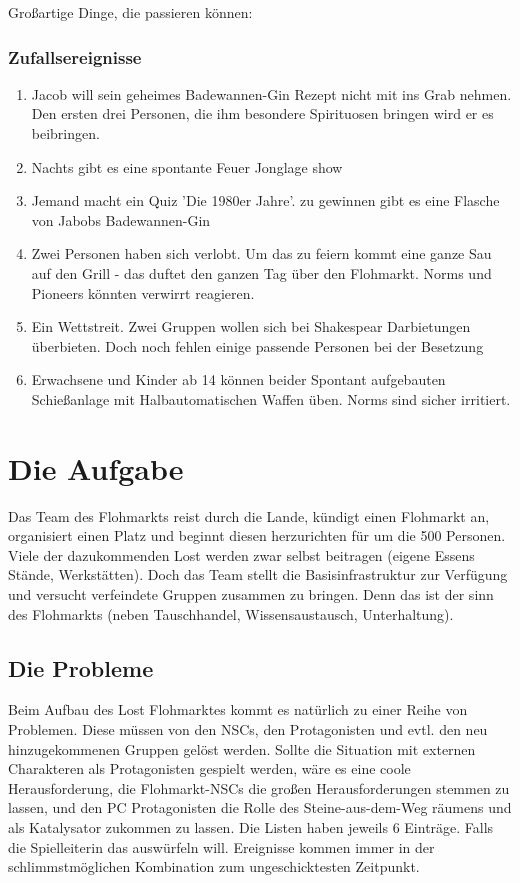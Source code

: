 Großartige Dinge, die passieren können:

\subsection{Zufallsereignisse}

\begin{enumerate}
    \item Jacob will sein geheimes Badewannen-Gin Rezept nicht mit ins Grab nehmen. Den ersten drei Personen, die ihm besondere Spirituosen bringen wird er es beibringen.
    \item Nachts gibt es eine spontante Feuer Jonglage show
    \item Jemand macht ein Quiz 'Die 1980er Jahre'. zu gewinnen gibt es eine Flasche von Jabobs Badewannen-Gin
    \item Zwei Personen haben sich verlobt. Um das zu feiern kommt eine ganze Sau auf den Grill - das duftet den ganzen Tag über den Flohmarkt. Norms und Pioneers könnten verwirrt reagieren.
    \item Ein Wettstreit. Zwei Gruppen wollen sich bei Shakespear Darbietungen überbieten. Doch noch fehlen einige passende Personen bei der Besetzung
    \item Erwachsene und Kinder ab 14 können beider Spontant aufgebauten Schießanlage mit Halbautomatischen Waffen üben. Norms sind sicher irritiert.
\end{enumerate}


\chapter{Die Aufgabe}

Das Team des Flohmarkts reist durch die Lande, kündigt einen Flohmarkt an, organisiert einen Platz und beginnt diesen herzurichten für um die 500 Personen. Viele der dazukommenden Lost werden zwar selbst beitragen (eigene Essens Stände, Werkstätten).
Doch das Team stellt die Basisinfrastruktur zur Verfügung und versucht verfeindete Gruppen zusammen zu bringen. Denn das ist der sinn des Flohmarkts (neben Tauschhandel, Wissensaustausch, Unterhaltung).

\section{Die Probleme}

Beim Aufbau des Lost Flohmarktes kommt es natürlich zu einer Reihe von Problemen. Diese müssen von den NSCs, den Protagonisten und evtl. den neu hinzugekommenen Gruppen gelöst werden. Sollte die Situation mit externen Charakteren als Protagonisten gespielt werden, wäre es eine coole Herausforderung, die Flohmarkt-NSCs die großen Herausforderungen stemmen zu lassen, und den PC Protagonisten die Rolle des Steine-aus-dem-Weg räumens und als Katalysator zukommen zu lassen. Die Listen haben jeweils 6 Einträge. Falls die Spielleiterin das auswürfeln will. Ereignisse kommen immer in der schlimmstmöglichen Kombination zum ungeschicktesten Zeitpunkt.

